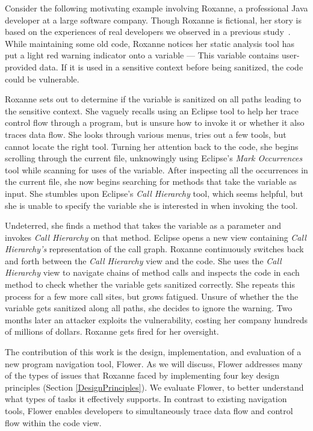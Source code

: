 \documentclass[conference]{IEEEtran}
\begin{document}

Consider the following motivating example involving Roxanne, a professional Java developer at a large software company.
Though Roxanne is fictional, her story is based on the experiences of real developers we observed in a previous study~\cite{Smith2015}.
While maintaining some old code, Roxanne notices her static analysis tool has put a light red warning indicator onto a variable --- This variable contains user-provided data. 
If it is used in a sensitive context before being sanitized, the code could be vulnerable.

Roxanne sets out to determine if the variable is sanitized on all paths leading to the sensitive context.
She vaguely recalls using an Eclipse tool to help her trace control flow through a program, but is unsure how to invoke it or whether it also traces data flow.
She looks through various menus, tries out a few tools, but cannot locate the right tool.
Turning her attention back to the code, she begins scrolling through the current file, unknowingly using Eclipse's \emph{Mark Occurrences} tool while scanning for uses of the variable. 
After inspecting all the occurrences in the current file, she now begins searching for methods that take the variable as input.
She stumbles upon Eclipse's \emph{Call Hierarchy} tool, which seems helpful, but she is unable to specify the variable she is interested in when invoking the tool.

Undeterred, she finds a method that takes the variable as a parameter and invokes \emph{Call Hierarchy} on that method.
Eclipse opens a new view containing \emph{Call Hierarchy's} representation of the call graph.
Roxanne continuously switches back and forth between the \emph{Call Hierarchy} view and the code.
She uses the \emph{Call Hierarchy} view to navigate chains of method calls and inspects the code in each method to check whether the variable gets sanitized correctly.
She repeats this process for a few more call sites, but grows fatigued. 
Unsure of whether the the variable gets sanitized along all paths, she decides to ignore the warning.
Two months later an attacker exploits the vulnerability, costing her company hundreds of millions of dollars. 
Roxanne gets fired for her oversight. 

The contribution of this work is the design, implementation, and evaluation of a new program navigation tool, Flower.
As we will discuss, Flower  addresses many of the types of issues that Roxanne faced by implementing four key design principles (Section \ref{DesignPrinciples}).
We evaluate Flower, to better understand what types of tasks it effectively supports. 
In contrast to existing navigation tools, Flower  enables developers to simultaneously trace data flow and control flow within the code view. 
\end{document}
